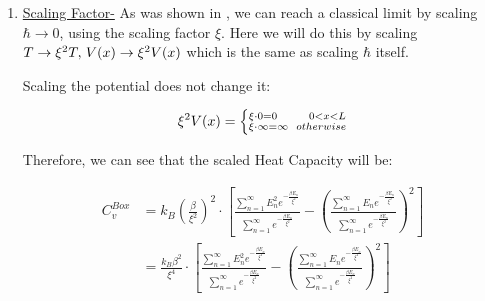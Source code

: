 \documentclass{article}
\numberwithin{equation}{subsection}
\begin{document}
\begin{enumerate}
\begin{enumerate}
        \item \underline{Scaling Factor-} As was shown in \cite{GelbwaserKlimovsky2018}, we can reach a classical limit by scaling $\hbar \rightarrow 0$, using the scaling factor $\xi$. Here we will do this by scaling $T \rightarrow \xi^2 T, \hspace{0.5mm}V(x) \rightarrow \xi^2V(x)$ which is the same as scaling $\hbar$ itself.
    
        Scaling the potential does not change it:
        
        \begin{equation}
        \begin{aligned}
            \xi^2 V(x) = \left\{ \substack{\xi \cdot 0 = 0 \hspace{8mm} 0<x<L \\ \xi \cdot \infty = \infty\hspace{2mm} otherwise}  \right.
        \end{aligned}
        \end{equation}
        
        Therefore, we can see that the scaled Heat Capacity will be:
        
        \begin{equation}
        \begin{split}
            C_v^{Box} &= k_B \left( \frac{\beta}{\xi^2} \right) ^2 \cdot \left[ \frac{\sum_{n=1}^\infty E_n^2 e^{- \frac{\beta E_n}{\xi^2}} }{\sum_{n=1}^\infty e^{-\frac{\beta E_n}{\xi^2} }} - \left( \frac{\sum_{n=1}^\infty E_n e^{-\frac{\beta E_n}{\xi^2} } }{\sum_{n=1}^\infty e^{-\frac{\beta E_n}{\xi^2} } } \right)^2 \right] 
            \\ 
            &= \frac{k_B \beta^2}{\xi^4} \cdot \left[ \frac{ \sum_{n=1}^\infty E_n^2 e^{- \frac{\beta E_n}{\xi^2}} }{\sum_{n=1}^\infty e^{-\frac{\beta E_n}{\xi^2} }} - \left( \frac{\sum_{n=1}^\infty E_n e^{-\frac{\beta E_n}{\xi^2} } }{\sum_{n=1}^\infty e^{-\frac{\beta E_n}{\xi^2} } } \right)^2 \right] 
        \end{split}
        \end{equation}
        

\end{enumerate}
\end{enumerate}
\end{document}
